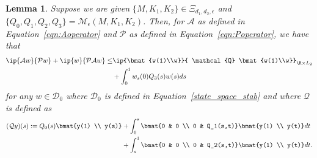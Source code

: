 \documentclass[9pt,journal,twocolumn]{IEEEtran}
\newtheorem{lemma}{Lemma}
\newcommand{\igzo}{\int_0^1}
\newcommand{\igzs}{\int_0^s}
\newcommand{\igso}{\int_s^1}
\begin{document}
\begin{lemma}\label{lem:primal}
Suppose we are given  $\{M,K_1,K_2\} \in \Xi_{d_1,d_2,\epsilon}$ and $\{Q_0,Q_1,Q_2,Q_3\}=\mathcal{M}_\epsilon(M,K_1,K_2)$. Then, for $\mathcal{A}$ as defined in Equation~\eqref{eqn:Aoperator} and $\mathcal{P}$ as defined in Equation~\eqref{eqn:Poperator}, we have that
\begin{align*}
\ip{\mathcal{A}w}{\mathcal{P}w}+\ip{w}{\mathcal{P}\mathcal{A}w} \le &  \ip{\bmat{w(1)\\w}}{ \mathcal{Q} \bmat{w(1)\\w}}_{\R \times L_2} \\
& + \igzo w_s(0)Q_3(s)w(s)ds
\end{align*}
for any $w \in \mathcal{D}_0$ where $\mathcal{D}_0$ is defined in Equation~\eqref{state_space_stab} and where $\mathcal{Q}$ is defined as
\begin{align*}
(\mathcal{Q}y)(s) :=  Q_0(s)\bmat{y(1) \\ y(s)} &+   \igzs  \bmat{0 & 0 \\ 0 & Q_1(s,t)} \bmat{y(1) \\ y(t)} dt \\
&+ \igso  \bmat{0 & 0 \\ 0 & Q_2(s,t)} \bmat{y(1) \\ y(t)} dt.
\end{align*}
\end{lemma}
\end{document}
